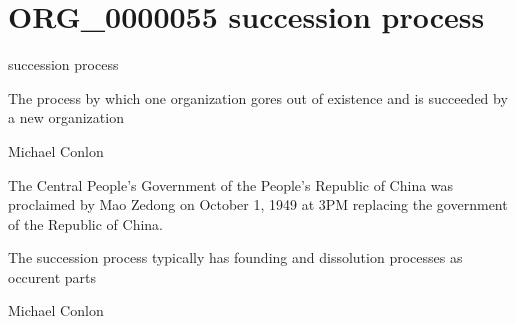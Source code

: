 \documentclass[letterpaper,10pt,english]{sphinxmanual}
\begin{document}
\section{ORG\_0000055 \sphinxhyphen{} succession process}
\label{\detokenize{doc-ORG_0000055:org-0000055-succession-process}}\label{\detokenize{doc-ORG_0000055:index-0}}\label{\detokenize{doc-ORG_0000055::doc}}
\begin{sphinxShadowBox}

\sphinxAtStartPar
succession process
\end{sphinxShadowBox}

\begin{sphinxShadowBox}

\sphinxAtStartPar
The process by which one organization gores out of existence and is succeeded by a new organization
\end{sphinxShadowBox}

\begin{sphinxShadowBox}

\sphinxAtStartPar
Michael Conlon 
\end{sphinxShadowBox}

\begin{sphinxShadowBox}

\sphinxAtStartPar
The Central People’s Government of the People’s Republic of China was proclaimed by Mao Zedong on October 1, 1949 at 3PM replacing the government of the Republic of China.
\end{sphinxShadowBox}

\begin{sphinxShadowBox}

\sphinxAtStartPar
The succession process typically has founding and dissolution processes as occurent parts
\end{sphinxShadowBox}

\begin{sphinxShadowBox}

\sphinxAtStartPar
Michael Conlon 
\end{sphinxShadowBox}
\begin{quote}
\label{\detokenize{doc-ORG_0000056:org-0000056}}\label{\detokenize{doc-ORG_0000056:succession-process-boundary}}\label{\detokenize{doc-ORG_0000056:org-0000056}}
\ignorespaces \end{quote}
\end{document}
